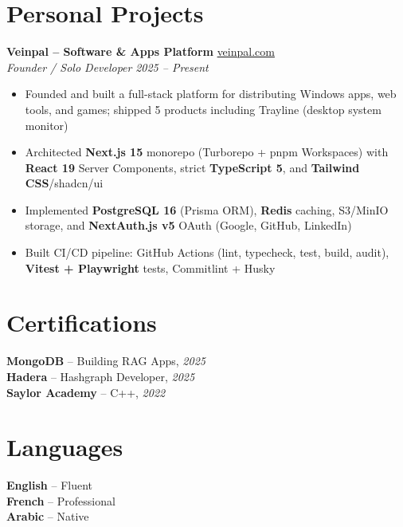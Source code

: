 \documentclass[10pt,a4paper]{article}
\begin{document}
\vspace{4pt}
\section*{Personal Projects}
{\small
\textbf{Veinpal -- Software \& Apps Platform} \hfill \href{https://veinpal.com}{veinpal.com}\\[1pt]
\textit{Founder / Solo Developer} \hfill \textit{2025 -- Present}
\begin{itemize}
  \item Founded and built a full-stack platform for distributing Windows apps, web tools, and games; shipped 5 products including Trayline (desktop system monitor)
  \item Architected \textbf{Next.js 15} monorepo (Turborepo + pnpm Workspaces) with \textbf{React 19} Server Components, strict \textbf{TypeScript 5}, and \textbf{Tailwind CSS}/shadcn/ui
  \item Implemented \textbf{PostgreSQL 16} (Prisma ORM), \textbf{Redis} caching, S3/MinIO storage, and \textbf{NextAuth.js v5} OAuth (Google, GitHub, LinkedIn)
  \item Built CI/CD pipeline: GitHub Actions (lint, typecheck, test, build, audit), \textbf{Vitest + Playwright} tests, Commitlint + Husky
\end{itemize}


}

\vspace{3pt}
\section*{Certifications}
{\small
\textbf{MongoDB} -- Building RAG Apps, \textit{2025}\\[1pt]
\textbf{Hadera} -- Hashgraph Developer, \textit{2025}\\[1pt]
\textbf{Saylor Academy} -- C++, \textit{2022}
}

\section*{Languages}
{\small
\textbf{English} -- Fluent\\[1pt]
\textbf{French} -- Professional\\[1pt]
\textbf{Arabic} -- Native
}
\end{document}
